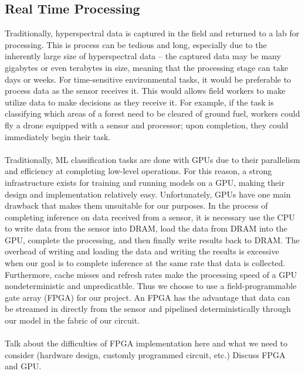 \documentclass{article}
\newcommand{\mycomment}[1]{}
\begin{document}
\subsection{Real Time Processing}
Traditionally, hyperspectral data is captured in the field and returned to a lab for processing. This is process can be tedious and long, especially due to the inherently large size of hyperspectral data -- the captured data may be many gigabytes or even terabytes in size, meaning that the processing stage can take days or weeks.\mycomment{Note: is this true??} For time-sensitive environmental tasks, it would be preferable to process data as the sensor receives it. This would allows field workers to make utilize data to make decisions as they receive it. For example, if the task is classifying which areas of a forest need to be cleared of ground fuel, workers could fly a drone equipped with a sensor and processor; upon completion, they could immediately begin their task.\\\\
Traditionally, ML classification tasks are done with GPUs due to their parallelism and efficiency at completing low-level operations. For this reason, a strong infrastructure exists for training and running models on a GPU, making their design and implementation relatively easy. Unfortunately, GPUs have one main drawback that makes them unsuitable for our purposes. In the process of completing inference on data received from a sensor, it is necessary use the CPU to write data from the sensor into DRAM, load the data from DRAM into the GPU, complete the processing, and then finally write results back to DRAM. The overhead of writing and loading the data and writing the results is excessive when our goal is to complete inference at the same rate that data is collected. Furthermore, cache misses and refresh rates make the processing speed of a GPU nondeterministic and unpredicatble. Thus we choose to use a field-programmable gate array (FPGA) for our project. An FPGA has the advantage that data can be streamed in directly from the sensor and pipelined deterministically through our model in the fabric of our circuit.\\\\
Talk about the difficulties of FPGA implementation here and what we need to consider (hardware design, customly programmed circuit, etc.)
Discuss FPGA and GPU.
\end{document}
